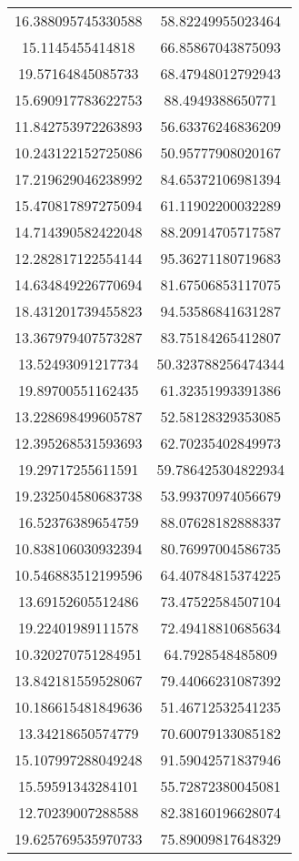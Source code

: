 \begin{table}
\begin{tabular}{cc}
16.388095745330588 & 58.82249955023464 \\
15.1145455414818 & 66.85867043875093 \\
19.57164845085733 & 68.47948012792943 \\
15.690917783622753 & 88.4949388650771 \\
11.842753972263893 & 56.63376246836209 \\
10.243122152725086 & 50.95777908020167 \\
17.219629046238992 & 84.65372106981394 \\
15.470817897275094 & 61.11902200032289 \\
14.714390582422048 & 88.20914705717587 \\
12.282817122554144 & 95.36271180719683 \\
14.634849226770694 & 81.67506853117075 \\
18.431201739455823 & 94.53586841631287 \\
13.367979407573287 & 83.75184265412807 \\
13.52493091217734 & 50.323788256474344 \\
19.89700551162435 & 61.32351993391386 \\
13.228698499605787 & 52.58128329353085 \\
12.395268531593693 & 62.70235402849973 \\
19.29717255611591 & 59.786425304822934 \\
19.232504580683738 & 53.99370974056679 \\
16.52376389654759 & 88.07628182888337 \\
10.838106030932394 & 80.76997004586735 \\
10.546883512199596 & 64.40784815374225 \\
13.69152605512486 & 73.47522584507104 \\
19.22401989111578 & 72.49418810685634 \\
10.320270751284951 & 64.7928548485809 \\
13.842181559528067 & 79.44066231087392 \\
10.186615481849636 & 51.46712532541235 \\
13.34218650574779 & 70.60079133085182 \\
15.107997288049248 & 91.59042571837946 \\
15.59591343284101 & 55.72872380045081 \\
12.70239007288588 & 82.38160196628074 \\
19.625769535970733 & 75.89009817648329 \\

\end{tabular}
\end{table}
